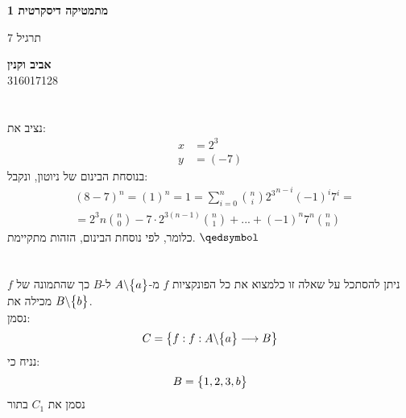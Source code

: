 \documentclass[a4paper, 12pt, leqno]{article}
\newcommand{\eq}[1]{\begin{align*}#1\end{align*}}
\newcommand{\set}[1]{\big{\{} #1 \big{\}}}
\renewcommand{\qed}{\hfill\(\qedsymbol\)}
\begin{document}
\begin{titlepage}
    \begin{center}
        \vspace*{4cm}
    
        {\fontsize{32pt}{32pt}\selectfont \textbf{מתמטיקה דיסקרטית 1}}
        
        \vspace{0.4cm}
        
        {\LARGE
        תרגיל 7}
    
        \vfill
            
        {
            \Large\textbf{אביב וקנין}
            \\
            316017128
        }
    \end{center}
\end{titlepage}

\section{}
נציב את:
\eq{
    x&=2^3\\
    y&=(-7)
}
בנוסחת הבינום של ניוטון, ונקבל:
\eq{
    &(8-7)^n=(1)^n=1=\sum^n_{i=0}\binom{n}{i}{2^3}^{n-i}(-1)^i7^i=\\
    &=2^3n\binom{n}{0}-7\cdot2^{3(n-1)}\binom{n}{1}+...+(-1)^n7^n\binom{n}{n}
}
כלומר, לפי נוסחת הבינום, הזהות מתקיימת.
\qed

\section{}
ניתן להסתכל על שאלה זו כלמצוא את כל הפונקציות $f$ מ-$A\backslash\set{a}$ ל-$B$ כך שהתמונה של $f$ מכילה את $B\backslash\set{b}$.\\
נסמן:
\eq{
    C=\set{f:f:A\backslash\set{a}\longrightarrow{B}}
}
נניח כי:
\eq{
    B=\set{1,2,3,b}
}
נסמן את $C_1$ בתור


\end{document}

